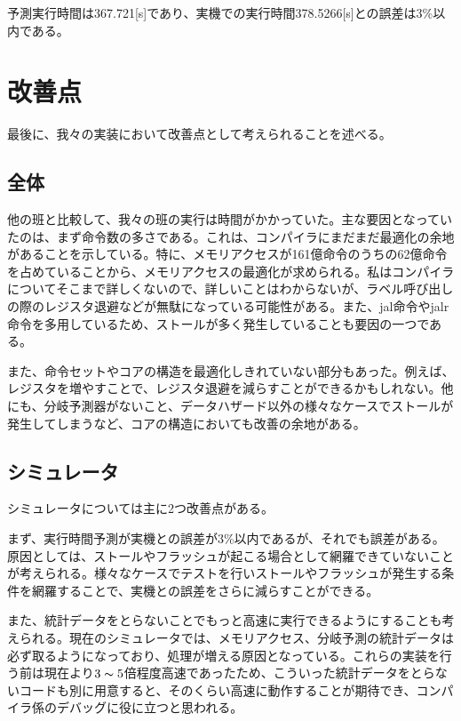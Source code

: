 \documentclass[a4paper,11pt]{ltjsarticle}
\begin{document}
予測実行時間は367.721[s]であり、実機での実行時間378.5266[s]との誤差は3\%以内である。

\section{改善点}
最後に、我々の実装において改善点として考えられることを述べる。
\subsection*{全体}
他の班と比較して、我々の班の実行は時間がかかっていた。主な要因となっていたのは、まず命令数の多さである。これは、コンパイラにまだまだ最適化の余地があることを示している。特に、メモリアクセスが161億命令のうちの62億命令を占めていることから、メモリアクセスの最適化が求められる。私はコンパイラについてそこまで詳しくないので、詳しいことはわからないが、ラベル呼び出しの際のレジスタ退避などが無駄になっている可能性がある。また、jal命令やjalr命令を多用しているため、ストールが多く発生していることも要因の一つである。

また、命令セットやコアの構造を最適化しきれていない部分もあった。例えば、レジスタを増やすことで、レジスタ退避を減らすことができるかもしれない。他にも、分岐予測器がないこと、データハザード以外の様々なケースでストールが発生してしまうなど、コアの構造においても改善の余地がある。
\subsection*{シミュレータ}
シミュレータについては主に2つ改善点がある。

まず、実行時間予測が実機との誤差が3\%以内であるが、それでも誤差がある。原因としては、ストールやフラッシュが起こる場合として網羅できていないことが考えられる。様々なケースでテストを行いストールやフラッシュが発生する条件を網羅することで、実機との誤差をさらに減らすことができる。

また、統計データをとらないことでもっと高速に実行できるようにすることも考えられる。現在のシミュレータでは、メモリアクセス、分岐予測の統計データは必ず取るようになっており、処理が増える原因となっている。これらの実装を行う前は現在より$3\thicksim5$倍程度高速であったため、こういった統計データをとらないコードも別に用意すると、そのくらい高速に動作することが期待でき、コンパイラ係のデバッグに役に立つと思われる。
\end{document}
